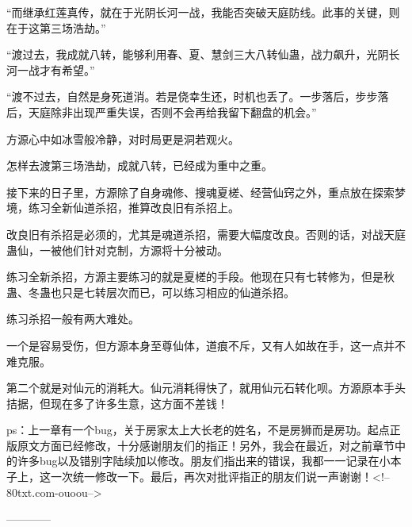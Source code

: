 \begin{this_body}
“而继承红莲真传，就在于光阴长河一战，我能否突破天庭防线。此事的关键，则在于这第三场浩劫。”

“渡过去，我成就八转，能够利用春、夏、慧剑三大八转仙蛊，战力飙升，光阴长河一战才有希望。”

“渡不过去，自然是身死道消。若是侥幸生还，时机也丢了。一步落后，步步落后，天庭除非出现严重失误，否则不会再给我留下翻盘的机会。”

方源心中如冰雪般冷静，对时局更是洞若观火。

怎样去渡第三场浩劫，成就八转，已经成为重中之重。

接下来的日子里，方源除了自身魂修、搜魂夏槎、经营仙窍之外，重点放在探索梦境，练习全新仙道杀招，推算改良旧有杀招上。

改良旧有杀招是必须的，尤其是魂道杀招，需要大幅度改良。否则的话，对战天庭蛊仙，一被他们针对克制，方源将十分被动。

练习全新杀招，方源主要练习的就是夏槎的手段。他现在只有七转修为，但是秋蛊、冬蛊也只是七转层次而已，可以练习相应的仙道杀招。

练习杀招一般有两大难处。

一个是容易受伤，但方源本身至尊仙体，道痕不斥，又有人如故在手，这一点并不难克服。

第二个就是对仙元的消耗大。仙元消耗得快了，就用仙元石转化呗。方源原本手头拮据，但现在多了许多生意，这方面不差钱！

ps：上一章有一个bug，关于房家太上大长老的姓名，不是房狮而是房功。起点正版原文方面已经修改，十分感谢朋友们的指正！另外，我会在最近，对之前章节中的许多bug以及错别字陆续加以修改。朋友们指出来的错误，我都一一记录在小本子上，这一次统一修改一下。最后，再次对批评指正的朋友们说一声谢谢！<!--80txt.com-ouoou-->

------------

\end{this_body}

